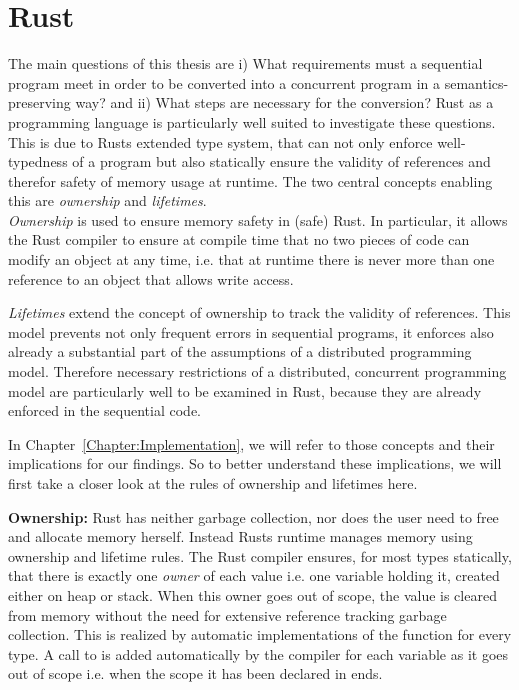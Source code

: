 \section{Rust}
\label{subsec:Rust}
The main questions of this thesis are i) What requirements must a sequential program meet in order to be converted into a concurrent program in a semantics-preserving way? and ii) What steps are necessary for the conversion? Rust as a programming language is particularly well suited to investigate these questions. This is due to Rusts extended type system, that can not only enforce well-typedness of a program but also statically ensure the validity of references and therefor safety of memory usage at runtime. The two central concepts enabling this are \emph{ownership} and \emph{lifetimes}.\\

\emph{Ownership} is used to ensure memory safety in (safe) Rust. In particular, it allows the Rust compiler to ensure at compile time that no two pieces of code can modify an object at any time, i.e. that at runtime there is never more than one reference to an object that allows write access. 

\emph{Lifetimes} extend the concept of ownership to track the validity of references. This model prevents not only frequent errors in sequential programs, it enforces also already a substantial part of the assumptions of a distributed programming model. Therefore necessary restrictions of a distributed, concurrent programming model are particularly well to be examined in Rust, because they are already enforced in the sequential code. 

In Chapter~\ref{Chapter:Implementation}, we will refer to those concepts and their implications for our findings. So to better understand these implications, we will first take a closer look at the rules of ownership and lifetimes here.

\textbf{Ownership:}
Rust has neither garbage collection, nor does the user need to free and allocate memory herself. Instead Rusts runtime manages memory using ownership and lifetime rules. The Rust compiler ensures, for most types statically, that there is exactly one \emph{owner} of each value i.e. one variable holding it, created either on heap or stack. When this owner goes out of scope, the value is cleared from memory without the need for extensive reference tracking garbage collection.
This is realized by automatic implementations of the  function for every type. A call to  is added automatically by the compiler for each variable as it goes out of scope i.e. when the scope it has been declared in ends.

